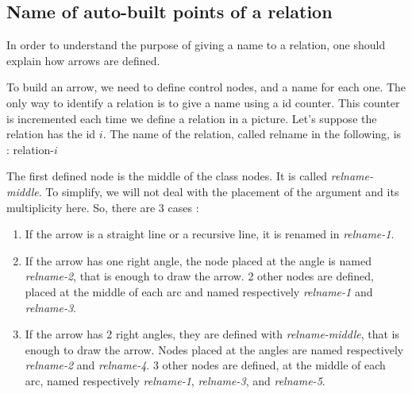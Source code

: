 \documentclass[a4paper,11pt]{report}
\newcommand{\inputTikZ}[1]{%
  }%
\newcommand{\inputTikZ}[1]{%
    \texttt{[image: fig/\#1.pdf]}%
  }%
\begin{document}
\subsection{Name of auto-built points of a relation}\label{ss.relptname}

In order to understand the purpose of giving a name to a relation, one should explain how arrows are defined.

To build an arrow, we need to define control nodes, and a name for each one. The only way to identify a relation is to give a name using a id counter. This counter is incremented each time we define a relation in a picture.
Let's suppose the relation has the id $i$. The name of the relation, called relname in the following, is : relation-$i$

The first defined node is the middle of the class nodes. It is called {\it relname-middle}. To simplify, we will not deal with the placement of the argument and its multiplicity here. So, there are 3 cases :

\begin{enumerate}
\item If the arrow is a straight line or a recursive line, it is renamed in {\it relname-1}.

\begin{center}
\inputTikZ{relationptname}
\end{center}

\item If the arrow has one right angle, the node placed at the angle is named {\it relname-2}, that is enough to draw the arrow. 2 other nodes are defined, placed at the middle of each arc and named respectively {\it relname-1} and {\it relname-3}.

\begin{center}
\inputTikZ{relationHVptname}
\end{center}

\item If the arrow has 2 right angles, they are defined with
{\it relname-middle}, that is enough to draw the arrow. Nodes placed at the angles are named respectively {\it relname-2} and {\it relname-4}. 3 other nodes are defined, at the middle of each arc, 
named respectively {\it relname-1}, {\it relname-3}, and {\it relname-5}.

\begin{center}
\inputTikZ{relationHVHptname}
\end{center}
\end{enumerate}
\end{document}
